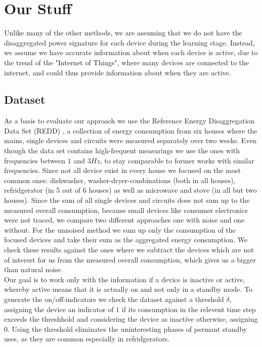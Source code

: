 \documentclass{article}
\begin{document}
\section{Our Stuff}


Unlike many of the other methods, we are assuming that we do not have the disaggregated power signature for each device during the learning stage.
Instead, we assume we have accurate information about when each device is active, due to the trend of the "Internet of Things", where many devices are connected to the internet, and could thus provide information about when they are active.


\subsection{Dataset}
As a basis to evaluate our approach we use the Reference Energy Disaggregation Data Set (REDD) \cite{Redd}, a collection of energy consumption 
from six houses where the mains, single devices and circuits were measured separately over two weeks. Even though the data set contains high-frequent 
measurings we use the ones with frequencies between $1$ and $3 Hz$, to stay comparable to former works with similar frequencies. Since not all 
device exist in every house we focused on the most common ones: dishwasher, washer-dryer-combinations (both in all houses), refridgerator (in 5 
out of 6 houses) as well as microwave and stove (in all but two houses). Since the sum of all single devices and circuits does not sum up to the 
measured overall consumption, because small devices like consumer electronics were not traced, we compare two different approaches one with noise 
and one without. For the unnoised method we sum up only the consumption of the focused devices and take their sum as the aggregated energy consumption. 
We check these results against the ones where we subtract the devices which are not of interest for us from the measured overall consumption, which 
gives us a bigger than natural noise.\\
Our goal is to work only with the information if a device is inactive or active, whereby active means that it is actually on and not only in a
standby mode. To generate the  on/off-indicators we check the dataset against a threshold $\delta$, assigning the device an indicator of $1$ if its 
consumption in the relevent time step exceeds the threshhold and considering the device as inactive otherwise, assigning $0$. Using the threshold 
eliminates the uninteresting phases of permant standby uses, as they are common especially in refridgerators.
\end{document}
